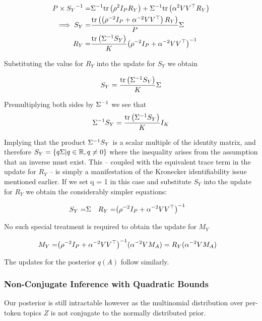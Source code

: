 \begin{align}
P \times {S_Y}^{-1} = & {\Sigma}^{-1}\text{tr} \left( {\rho^2 I_P R_Y} \right) + {\Sigma}^{-1}\text{tr} \left( {\alpha^2 V V^\top R_Y} \right) \\
\implies S_Y = & \frac{\text{tr} \left( {\left(\rho^{-2} I_P + \alpha^{-2} V V^\top\right) R_Y} \right)}{P} \Sigma \\ 
R_Y = & \frac{\text{tr} \left( {{\Sigma}^{-1}S_Y} \right)}{K} {\left( \rho^{-2} I_P + \alpha^{-2} V V^\top \right)}^{-1}\end{align}

Substituting the value for $R_Y$ into the update for $S_Y$ we obtain

\begin{align}
S_Y = \frac{\text{tr} \left( {{\Sigma}^{-1}S_Y} \right)}{K} \Sigma
\end{align}

Premultiplying both sides by ${\Sigma}^{-1}$ we see that
\begin{align}
{\Sigma}^{-1} S_Y = \frac{\text{tr} \left( {{\Sigma}^{-1}S_Y} \right)}{K} I_K
\end{align}

Implying that the product ${\Sigma}^{-1} S_Y$ is a scalar multiple of the identity matrix, and therefore $S_Y = \{ q \Sigma | q \in { \mathbb{R} }, q \neq 0 \}$ where the inequality arises from the assumption that an inverse must exist. This -- coupled with the equivalent trace term in the update for $R_Y$ -- is simply a manifestation of the Kronecker identifiability issue mentioned earlier. If we set q = 1 in this case and substitute $S_Y$ into the update for $R_Y$ we obtain the considerably simpler equations:

\begin{align}
S_Y = & \Sigma &
R_Y = & {\left( \rho^{-2} I_P + \alpha^{-2}V V^\top \right)}^{-1}
\end{align}

No such special treatment is required to obtain the update for $M_Y$

\begin{align}
M_Y = & {\left( \rho^{-2} I_P + \alpha^{-2} V V^\top \right)}^{-1}(\alpha^{-2}V M_A) = R_Y (\alpha^{-2} V M_A)
\end{align}

The updates for the posterior $q(A)$ follow similarly.

\subsubsection{Non-Conjugate Inference with Quadratic Bounds}
Our posterior is still intractable however as the multinomial distribution over per-token topics $Z$ is not conjugate to the normally distributed prior.

